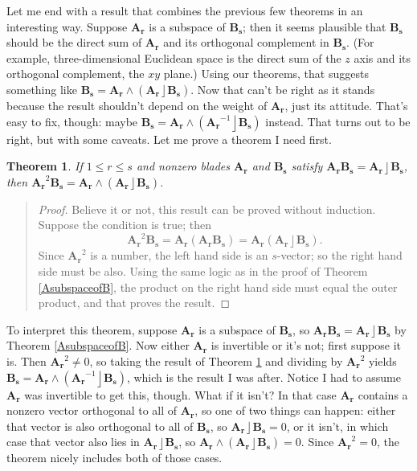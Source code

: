 \documentclass{utarticle}
\newcommand{\bl}[1]{\ensuremath{\bm{#1}}}
\DeclareMathOperator{\lin}{\rfloor}
\DeclareMathOperator{\out}{\wedge}
\newtheorem{thm}{Theorem}
\newcommand{\bp}{\begin{quotation} \begin{proof}}
\newcommand{\ep}{\end{proof} \end{quotation}}
\begin{document}
Let me end with a result that combines the previous few theorems in an interesting way.
Suppose \bl{A_r} is a subspace of \bl{B_s}; then it seems plausible that \bl{B_s} should be 
the direct sum of \bl{A_r} and its orthogonal complement in \bl{B_s}.  (For example, 
three-dimensional Euclidean space is the direct sum of the $z$ axis and its orthogonal 
complement, the $xy$ plane.)  Using our theorems, that suggests something like $\bl{B_s} = 
\bl{A_r} \out (\bl{A_r} \lin \bl{B_s})$.  Now that can't be right as it stands because the result 
shouldn't depend on the weight of \bl{A_r}, just its attitude.  That's easy to fix, though: 
maybe $\bl{B_s} = \bl{A_r} \out (\bl{A_r}^{-1} \lin \bl{B_s})$ instead.  That turns out to be right,
but with some caveats.  Let me prove a theorem I need first.
\begin{thm}
If $1 \leq r \leq s$ and nonzero blades \bl{A_r} and \bl{B_s} satisfy $\bl{A_r} \bl{B_s} = \bl{A_r} 
\lin \bl{B_s}$, then $\bl{A_r}^2 \bl{B_s} = \bl{A_r} \out (\bl{A_r} \lin \bl{B_s})$.  
\label{miscident}
\end{thm}
\bp
Believe it or not, this result can be proved without induction.  Suppose the 
condition is true; then
\begin{equation}
\bl{A_r}^2 \bl{B_s} = \bl{A_r} (\bl{A_r} \bl{B_s}) = \bl{A_r} (\bl{A_r} \lin \bl{B_s}).
\end{equation}
Since $\bl{A_r}^2$ is a number, the left hand side is an $s$-vector; so the right hand side 
must be also.  Using the same logic as in the proof of Theorem \ref{AsubspaceofB}, the 
product on the right hand side must equal the outer product, and that proves the result.
\ep
To interpret this theorem, suppose \bl{A_r} is a subspace of \bl{B_s}, so $\bl{A_r} \bl{B_s} 
= \bl{A_r} \lin \bl{B_s}$ by Theorem \ref{AsubspaceofB}.  Now either \bl{A_r} is invertible 
or it's not; first suppose it is.  Then $\bl{A_r}^2 \neq 0$, so taking the result of Theorem 
\ref{miscident} and dividing by $\bl{A_r}^2$ yields $\bl{B_s} = \bl{A_r} \out (\bl{A_r}^{-1} 
\lin \bl{B_s})$, which is the result I was after.  Notice I had to assume \bl{A_r} was invertible 
to get this, though.  What if it isn't?  In that case \bl{A_r} contains a nonzero vector 
orthogonal to all of \bl{A_r}, so one of two things can happen: either that vector 
is also orthogonal to all of \bl{B_s}, so $\bl{A_r} \lin \bl{B_s} = 0$, or it isn't, in 
which case that vector also lies in $\bl{A_r} \lin \bl{B_s}$, so $\bl{A_r} \out (\bl{A_r} 
\lin \bl{B_s}) = 0$. Since $\bl{A_r}^2 = 0$, the theorem nicely includes both of 
those cases.
\end{document}
